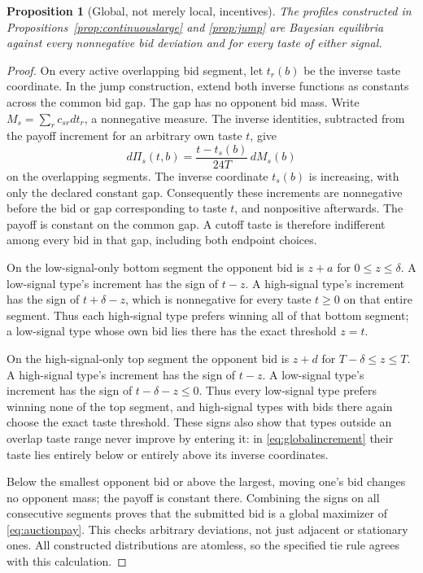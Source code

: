 \documentclass[11pt,a4paper]{article}
\newtheorem{proposition}[theorem]{Proposition}
\theoremstyle{remark}\newtheorem{remark}[theorem]{Remark}
\begin{document}
\begin{proposition}[Global, not merely local, incentives]\label{prop:global}
The profiles constructed in Propositions~\ref{prop:continuouslarge} and \ref{prop:jump} are Bayesian equilibria against every nonnegative bid deviation and for every taste of either signal.
\end{proposition}
\begin{proof}
On every active overlapping bid segment, let $t_r(b)$ be the inverse taste coordinate. In the jump construction, extend both inverse functions as constants across the common bid gap. The gap has no opponent bid mass. Write $M_s=\sum_r c_{sr}dt_r$, a nonnegative measure. The inverse identities, subtracted from the payoff increment for an arbitrary own taste $t$, give
\begin{equation}\label{eq:globalincrement}
 d\Pi_s(t,b)=\frac{t-t_s(b)}{24T}\,dM_s(b)
\end{equation}
on the overlapping segments. The inverse coordinate $t_s(b)$ is increasing, with only the declared constant gap. Consequently these increments are nonnegative before the bid or gap corresponding to taste $t$, and nonpositive afterwards. The payoff is constant on the common gap. A cutoff taste is therefore indifferent among every bid in that gap, including both endpoint choices.

On the low-signal-only bottom segment the opponent bid is $z+a$ for $0\le z\le\delta$. A low-signal type's increment has the sign of $t-z$. A high-signal type's increment has the sign of $t+\delta-z$, which is nonnegative for every taste $t\ge0$ on that entire segment. Thus each high-signal type prefers winning all of that bottom segment; a low-signal type whose own bid lies there has the exact threshold $z=t$.

On the high-signal-only top segment the opponent bid is $z+d$ for $T-\delta\le z\le T$. A high-signal type's increment has the sign of $t-z$. A low-signal type's increment has the sign of $t-\delta-z\le0$. Thus every low-signal type prefers winning none of the top segment, and high-signal types with bids there again choose the exact taste threshold. These signs also show that types outside an overlap taste range never improve by entering it: in \eqref{eq:globalincrement} their taste lies entirely below or entirely above its inverse coordinates.

Below the smallest opponent bid or above the largest, moving one's bid changes no opponent mass; the payoff is constant there. Combining the signs on all consecutive segments proves that the submitted bid is a global maximizer of \eqref{eq:auctionpay}. This checks arbitrary deviations, not just adjacent or stationary ones. All constructed distributions are atomless, so the specified tie rule agrees with this calculation.
\end{proof}
\end{document}
